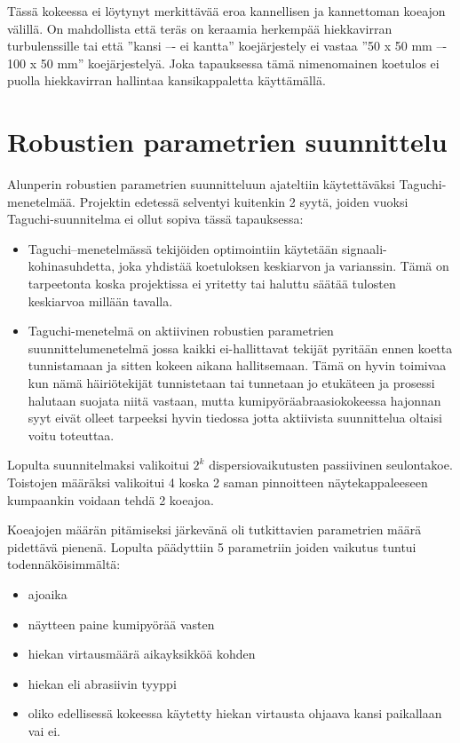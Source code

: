 \documentclass[12pt,a4paper,finnish]{tutthesis}
\begin{document}
Tässä kokeessa ei löytynyt merkittävää eroa kannellisen ja kannettoman koeajon välillä.
On mahdollista että teräs on keraamia herkempää hiekkavirran turbulenssille tai että ”kansi –- ei kantta” koejärjestely ei vastaa ”50 x 50 mm –- 100 x 50 mm” koejärjestelyä. Joka tapauksessa tämä nimenomainen koetulos ei puolla hiekkavirran hallintaa kansikappaletta käyttämällä.

\section{Robustien parametrien suunnittelu}

Alunperin robustien parametrien suunnitteluun ajateltiin käytettäväksi
Taguchi-menetelmää. Projektin edetessä selventyi kuitenkin 2 syytä, joiden
vuoksi Taguchi-suunnitelma ei ollut sopiva tässä tapauksessa:

\begin{itemize}
  \item Taguchi–menetelmässä tekijöiden optimointiin käytetään
signaali-kohinasuhdetta, joka yhdistää koetuloksen keskiarvon ja varianssin. Tämä on tarpeetonta koska projektissa ei
yritetty tai haluttu säätää tulosten keskiarvoa millään tavalla.
  \item Taguchi-menetelmä on aktiivinen robustien parametrien suunnittelumenetelmä jossa kaikki ei-hallittavat tekijät pyritään ennen koetta tunnistamaan ja sitten kokeen aikana hallitsemaan. Tämä on hyvin toimivaa kun nämä häiriötekijät tunnistetaan tai tunnetaan jo etukäteen ja prosessi halutaan suojata niitä vastaan, mutta kumipyöräabraasiokokeessa
hajonnan syyt eivät olleet tarpeeksi hyvin tiedossa jotta aktiivista suunnittelua
oltaisi voitu toteuttaa.
\end{itemize}

Lopulta suunnitelmaksi valikoitui $2^k$ dispersiovaikutusten passiivinen seulontakoe. Toistojen määräksi valikoitui 4 koska 2
saman pinnoitteen näytekappaleeseen kumpaankin voidaan tehdä 2 koeajoa.

Koeajojen määrän pitämiseksi järkevänä oli tutkittavien parametrien määrä pidettävä pienenä. Lopulta päädyttiin 5 parametriin joiden vaikutus tuntui todennäköisimmältä:

\begin{itemize}
  \item ajoaika
  \item näytteen paine kumipyörää vasten
  \item hiekan virtausmäärä aikayksikköä kohden
  \item hiekan eli abrasiivin tyyppi
  \item oliko edellisessä kokeessa käytetty hiekan virtausta ohjaava kansi paikallaan vai ei.
\end{itemize}
\end{document}

